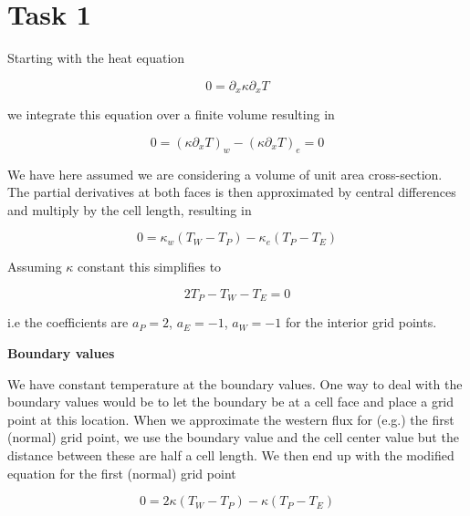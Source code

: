 \documentclass{article}
\begin{document}

\section{Task 1}

Starting with the heat equation

\begin{equation}
0 = \partial_x \kappa \partial_x T
\end{equation}

we integrate this equation over a finite volume resulting in

\begin{equation}
\label{eq:fvm_exact}
0 = (\kappa \partial_x T)_w - (\kappa \partial_x T)_e = 0
\end{equation}

We have here assumed we are considering a volume of unit area cross-section. The partial derivatives at both faces is then approximated by central differences and multiply by the cell length, resulting in

\begin{equation}
0 = \kappa_w ( T_W - T_P ) - \kappa_e ( T_P - T_E )
\end{equation}

Assuming $\kappa$ constant this simplifies to

\begin{equation}
2 T_P - T_W - T_E = 0 
\end{equation}

i.e the coefficients are $a_P = 2$, $a_E = -1 $, $a_W = -1 $ for the interior grid points.

\textbf{Boundary values}

We have constant temperature at the boundary values. One way to deal with the boundary values would be to let the boundary be at a cell face and place a grid point at this location. When we approximate the western flux for (e.g.) the first (normal) grid point, we use the boundary value and the cell center value but the distance between these are half a cell length. We then end up with the modified equation for the first (normal) grid point

\begin{equation}
0 = 2\kappa ( T_W - T_P ) - \kappa ( T_P - T_E )
\end{equation}
\end{document}
